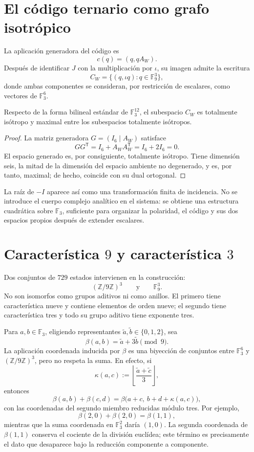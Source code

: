 \section{El código ternario como grafo isotrópico}

La aplicación generadora del código es
\[
 c(q)=(q,qA_W).
\]
Después de identificar \(J\) con la multiplicación por \(\iota\), su imagen
admite la escritura
\[
 C_W=\{(q,\iota q):q\in\mathbb F_9^3\},
\]
donde ambas componentes se consideran, por restricción de escalares, como
vectores de \(\mathbb F_3^6\).

\begin{proposition}
\label{prop:golay-grafo-isotropico}
Respecto de la forma bilineal estándar de \(\mathbb F_3^{12}\), el
subespacio \(C_W\) es totalmente isótropo y maximal entre los subespacios
totalmente isótropos.
\end{proposition}

\begin{proof}
La matriz generadora \(G=(I_6\mid A_W)\) satisface
\[
 GG^{\mathsf T}=I_6+A_WA_W^{\mathsf T}=I_6+2I_6=0.
\]
El espacio generado es, por consiguiente, totalmente isótropo. Tiene
dimensión seis, la mitad de la dimensión del espacio ambiente no degenerado,
y es, por tanto, maximal; de hecho, coincide con su dual ortogonal.
\end{proof}

La raíz de \(-I\) aparece así como una transformación finita de incidencia.
No se introduce el cuerpo complejo analítico en el sistema: se obtiene una
estructura cuadrática sobre \(\mathbb F_3\), suficiente para organizar la
polaridad, el código y sus dos espacios propios después de extender
escalares.

\section{Característica \(9\) y característica \(3\)}

Dos conjuntos de \(729\) estados intervienen en la construcción:
\[
 (\mathbb Z/9\mathbb Z)^3
 \qquad\text{y}\qquad
 \mathbb F_9^3.
\]
No son isomorfos como grupos aditivos ni como anillos. El primero tiene
característica nueve y contiene elementos de orden nueve; el segundo tiene
característica tres y todo su grupo aditivo tiene exponente tres.

Para \(a,b\in\mathbb F_3\), eligiendo representantes
\(\widetilde a,\widetilde b\in\{0,1,2\}\), sea
\[
 \beta(a,b)=\widetilde a+3\widetilde b\pmod 9.
\]
La aplicación coordenada inducida por \(\beta\) es una biyección de
conjuntos entre \(\mathbb F_3^6\) y \((\mathbb Z/9\mathbb Z)^3\), pero no
respeta la suma. En efecto, si
\[
 \kappa(a,c)
 :=\left\lfloor
 \frac{\widetilde a+\widetilde c}{3}
 \right\rfloor,
\]
entonces
\[
 \beta(a,b)+\beta(c,d)
 =\beta\bigl(a+c,\ b+d+\kappa(a,c)\bigr),
\]
con las coordenadas del segundo miembro reducidas módulo tres. Por ejemplo,
\[
 \beta(2,0)+\beta(2,0)=\beta(1,1),
\]
mientras que la suma coordenada en \(\mathbb F_3^2\) daría \((1,0)\). La
segunda coordenada de \(\beta(1,1)\) conserva el cociente de la división
euclídea; este término es precisamente el dato que desaparece bajo la
reducción componente a componente.

